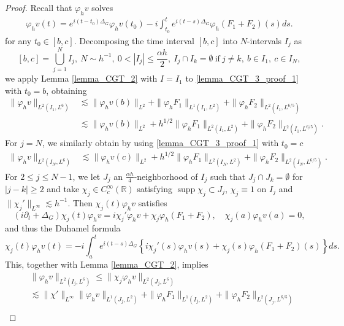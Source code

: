 \documentclass[10pt%
]{amsart}
\numberwithin{equation}{section}
\newcommand{\R}{\mathbb{R}}
\theoremstyle{definition}
\begin{document}
\begin{proof}
	Recall that $\varphi_hv$ solves
	\begin{align}
		\label{lemma_CGT_3_proof_1}
		\varphi_hv(t)=e^{i(t-t_0)\Delta_G}\varphi_hv(t_0)-i\int_{t_0}^t e^{i(t-s)\Delta_G}\varphi_h(F_1+F_2)(s)ds.
	\end{align}
	for any $t_0\in[b,c]$. Decomposing the time interval $[b,c]$ into $N$-intervals $I_j$ as
	$$
	[b,c]=\bigcup_{j=1}^NI_j,\ N\sim h^{-1},\ 0<|I_j|\le \frac{\alpha h}{2},\ I_j\cap I_k=\emptyset\ \text{if}\ j\neq k,\ b\in I_1,\ c\in I_N, 
	$$
	we apply Lemma \ref{lemma_CGT_2} with $I=I_1$ to \eqref{lemma_CGT_3_proof_1} with $t_0=b$, obtaining
	\begin{align}
		\label{lemma_CGT_3_proof_2}
		\|\varphi_h v\|_{L^2(I_1,L^6)}
		&\lesssim \|\varphi_hv(b)\|_{L^2}+\|\varphi_h F_1\|_{L^1(I_1,L^2)}+\|\varphi_hF_2\|_{L^2(I_1,L^{6/5})}\\
		\nonumber
		&\lesssim \|\varphi_hv(b)\|_{L^2}+h^{1/2}\|\varphi_h F_1\|_{L^2(I_1,L^2)}+\|\varphi_hF_2\|_{L^2(I_1,L^{6/5})}.
	\end{align}
	For $j=N$, we similarly obtain by using \eqref{lemma_CGT_3_proof_1} with $t_0=c$
	\begin{align}
		\|\varphi_h v\|_{L^2(I_N,L^6)}
		\label{lemma_CGT_3_proof_3}
		&\lesssim \|\varphi_hv(c)\|_{L^2}+h^{1/2}\|\varphi_h F_1\|_{L^2(I_N,L^2)}+\|\varphi_hF_2\|_{L^2(I_N,L^{6/5})}.
	\end{align}
	For $2\le j\le N-1$, we let $J_j$ an $\frac{\alpha h}{4}$-neighborhood of $I_j$ such that $J_j\cap J_k=\emptyset$ for $|j-k|\ge2$ and take $\chi_j\in C_c^\infty(\R)$ satisfying $\mathop{\mathrm{supp}} \chi_j\subset J_j$, $\chi_j\equiv1$ on $I_j$ and $\|\chi_j'\|_{L^\infty}\lesssim h^{-1}$. Then $\chi_j(t)\varphi_hv$ satisfies
	$$
	(i\partial_t+\Delta_G)\chi_j(t)\varphi_hv=i\chi_j'\varphi_hv+\chi_j\varphi_h(F_1+F_2),\quad \chi_j(a)\varphi_hv(a)=0,
	$$
	and  thus the Duhamel formula
	$$
	\chi_j(t)\varphi_hv(t)=-i\int_{a}^t e^{i(t-s)\Delta_G}\left\{i\chi_j'(s)\varphi_hv(s)+\chi_j(s)\varphi_h(F_1+F_2)(s)\right\}ds.
	$$
	This, together with Lemma \ref{lemma_CGT_2}, implies
	\begin{align}
		\label{lemma_CGT_3_proof_4}
		&\|\varphi_hv\|_{L^2(I_j,L^6)}
		\le \|\chi_j\varphi_hv\|_{L^2(J_j,L^6)}\\
		\nonumber
		&\lesssim \|\chi'\|_{L^\infty}\|\varphi_hv\|_{L^1(J_j,L^2)}+\|\varphi_hF_1\|_{L^1(I_j,L^2)}+\|\varphi_hF_2\|_{L^2(J_j,L^{6/5})}\\

\end{align}
\end{proof}
\end{document}
